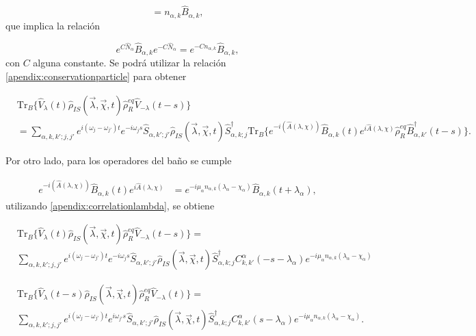 \begin{appendixs}
\begin{equation*}
    [\hat{B}_{\alpha,k},\hat{N}_{\alpha}] = n_{\alpha,k}\hat{B}_{\alpha,k},
\end{equation*}
que implica la relación 

\begin{equation}
    e^{C\hat{N}_{\alpha}}\hat{B}_{\alpha,k}e^{-C\hat{N}_{\alpha}} = e^{-Cn_{\alpha,k}}\hat{B}_{\alpha,k}, 
    \label{apendix:conservationparticle}
\end{equation}
con $C$ alguna constante. Se podrá utilizar la relación \ref{apendix:conservationparticle} para obtener

\begin{align*}
   & \text{Tr}_{B}\{ \hat{V}_{\lambda}(t)\hat{\rho}_{IS}(\vec{\lambda},\vec{\chi},t)\hat{\rho}_{R}^{eq}\hat{V}_{-\lambda}(t-s) \} \\
   & = \sum_{\alpha,k,k';j,j'}e^{i(\omega_{j}-\omega_{j'})t}e^{-i\omega_{j}s}\hat{S}_{\alpha,k';j'}\hat{\rho}_{IS}(\vec{\lambda},\vec{\chi},t)\hat{S}^{\dagger}_{\alpha,k;j} \text{Tr}_{B}\{e^{-i(\hat{A}(\lambda,\chi))} \hat{B}_{\alpha,k}(t)e^{i\hat{A}(\lambda,\chi)}\hat{\rho}_{R}^{eq}\hat{B}^{\dagger}_{\alpha,k'}(t-s) \}.
\end{align*}

Por otro lado, para los operadores del baño se cumple

\begin{align}
    e^{-i(\hat{A}(\lambda,\chi))} \hat{B}_{\alpha,k}(t)e^{i\hat{A}(\lambda,\chi)} & = e^{-i\mu_{\alpha}n_{\alpha,k}(\lambda_{\alpha}-\chi_{\alpha})} \hat{B}_{\alpha,k}(t+\lambda_{\alpha}), 
    \label{apendix:correlationlambda}
\end{align}
utilizando \ref{apendix:correlationlambda}, se obtiene

\begin{align*}
 & \text{Tr}_{B}\{ \hat{V}_{\lambda}(t)\hat{\rho}_{IS}(\vec{\lambda},\vec{\chi},t)\hat{\rho}_{R}^{eq}\hat{V}_{-\lambda}(t-s) \} = \\
 & \sum_{\alpha,k,k';j,j'}e^{i(\omega_{j}-\omega_{j'})t}e^{-i\omega_{j}s}\hat{S}_{\alpha,k';j'}\hat{\rho}_{IS}(\vec{\lambda},\vec{\chi},t)\hat{S}^{\dagger}_{\alpha,k;j} C^{\alpha}_{k,k'}(-s-\lambda_{\alpha})e^{-i\mu_{\alpha}n_{\alpha,k}(\lambda_{\alpha}-\chi_{\alpha})}
 \end{align*}

 \begin{align*}
    & \text{Tr}_{B}\{ \hat{V}_{\lambda}(t-s)\hat{\rho}_{IS}(\vec{\lambda},\vec{\chi},t)\hat{\rho}_{R}^{eq}\hat{V}_{-\lambda}(t) \} = \\
    & \sum_{\alpha,k,k';j,j'}e^{i(\omega_{j}-\omega_{j'})t}e^{i\omega_{j'}s}\hat{S}_{\alpha,k';j'}\hat{\rho}_{IS}(\vec{\lambda},\vec{\chi},t)\hat{S}^{\dagger}_{\alpha,k;j} C^{\alpha}_{k,k'}(s-\lambda_{\alpha})e^{-i\mu_{\alpha}n_{\alpha,k}(\lambda_{\alpha}-\chi_{\alpha})}.
    \end{align*}
   

\end{appendixs}
